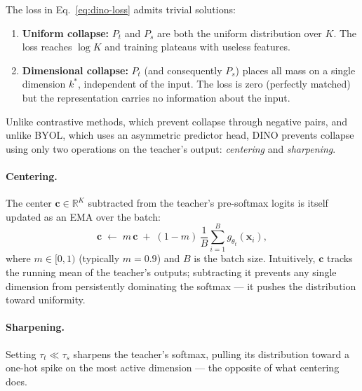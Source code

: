 \documentclass[11pt,a4paper]{article}
\newcommand{\R}{\mathbb{R}}
\newcommand{\vect}[1]{\mathbf{#1}}
\newcommand{\thetaT}{\theta_{t}}
\newcommand{\gT}{g_{\thetaT}}
\newcommand{\PS}{P_{s}}
\newcommand{\PT}{P_{t}}
\begin{document}
The loss in Eq.~\eqref{eq:dino-loss} admits trivial solutions:
\begin{enumerate}[leftmargin=*]
  \item \textbf{Uniform collapse:} $\PT$ and $\PS$ are both the uniform
  distribution over $K$. The loss reaches $\log K$ and training plateaus
  with useless features.
  \item \textbf{Dimensional collapse:} $\PT$ (and consequently $\PS$) places
  all mass on a single dimension $k^{*}$, independent of the input. The loss
  is zero (perfectly matched) but the representation carries no information
  about the input.
\end{enumerate}
Unlike contrastive methods, which prevent collapse through negative pairs,
and unlike BYOL, which uses an asymmetric predictor head, DINO prevents
collapse using only two operations on the teacher's output: \emph{centering}
and \emph{sharpening}.

\paragraph{Centering.} The center $\vect{c} \in \R^{K}$ subtracted from the
teacher's pre-softmax logits is itself updated as an EMA over the batch:
\begin{equation}
\vect{c} \;\leftarrow\; m\,\vect{c} \;+\; (1-m)\, \frac{1}{B}\sum_{i=1}^{B}\gT(\vect{x}_{i}),
\label{eq:center}
\end{equation}
where $m \in [0,1)$ (typically $m=0.9$) and $B$ is the batch size.
Intuitively, $\vect{c}$ tracks the running mean of the teacher's outputs;
subtracting it prevents any single dimension from persistently dominating
the softmax --- it pushes the distribution toward uniformity.

\paragraph{Sharpening.} Setting $\tau_{t} \ll \tau_{s}$ sharpens the
teacher's softmax, pulling its distribution toward a one-hot spike on the
most active dimension --- the opposite of what centering does.
\end{document}
